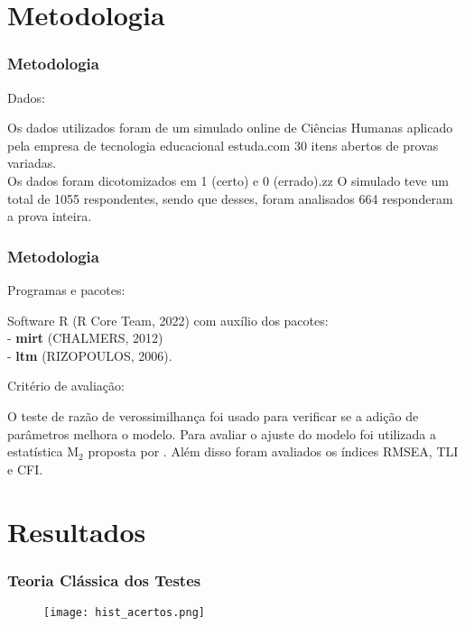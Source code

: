 \documentclass{beamer}
\begin{document}
	\section{Metodologia}
	
	\begin{frame}
		
		\frametitle{Metodologia}
		
		\begin{center}	Dados:	\end{center}
		
		Os dados utilizados foram de um simulado online de Ciências Humanas aplicado pela empresa de tecnologia educacional estuda.com
		30 itens abertos de provas variadas.\\
		\pause
		Os dados foram dicotomizados em 1 (certo) e 0 (errado).zz
		\pause
		O simulado teve um total de 1055 respondentes, sendo que desses, foram analisados 664	responderam a prova inteira.

	\end{frame}
	
	\begin{frame}
		
		\frametitle{Metodologia}
		\begin{center}	Programas e pacotes: \end{center}
		Software R (R Core Team, 2022) com auxílio dos pacotes: \\
		- \textbf{mirt} (CHALMERS, 2012)\\
		- \textbf{ltm} (RIZOPOULOS, 2006).\\ \pause
		
		\begin{center}	Critério de avaliação:	\end{center}
		
		O teste de razão de verossimilhança foi usado para verificar se a adição de parâmetros melhora o modelo. Para avaliar o ajuste do modelo foi utilizada a estatística M$_2$ proposta por \cite{maydeu2005limited}. 
		Além disso foram avaliados os índices RMSEA, TLI e CFI.

	\end{frame}
	\section{Resultados}
	
	\begin{frame}
		
	\frametitle{Teoria Clássica dos Testes}
		
	\begin{figure}[H]
		\texttt{[image: hist\_acertos.png]}
	\end{figure}
		
	\end{frame}
	
\end{document}
